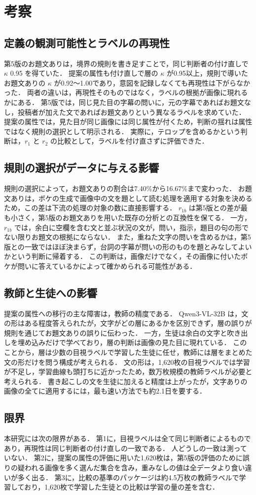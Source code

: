 \section{考察}
\label{sec_discussion}
\subsection{定義の観測可能性とラベルの再現性}
第5版のお題文ありは，境界の規則を書き足すことで，同じ判断者の付け直しで $ \kappa $ 0.95 を得ていた．
提案の属性も付け直しで層の $ \kappa $ が0.95以上，規則で導いたお題文ありの $ \kappa $ が0.92〜1.00であり，意図を記録しなくても再現性は下がらなかった．
両者の違いは，再現性そのものではなく，ラベルの根拠が画像に現れるかにある．
第5版では，同じ見た目の字幕の問いに，元の字幕であればお題文なし，投稿者が加えた文であればお題文ありという異なるラベルを求めていた．
提案の属性では，見た目が同じ画像には同じ属性が付くため，判断の揺れは属性ではなく規則の選択として明示される．
実際に，テロップを含めるかという判断は，$ r_1 $ と $ r_2 $ の比較として，ラベルを付け直さずに評価できた．

\subsection{規則の選択がデータに与える影響}
規則の選択によって，お題文ありの割合は7.40\%から16.67\%まで変わった．
お題文ありは，ボケの生成で画像中の文を題として読む処理を適用する対象を決めるため，この差は下流の処理の対象の数に直接影響する．
$ r_{1b} $ は第5版との差が最も小さく，第5版のお題文ありを用いた既存の分析との互換性を保てる．
一方，$ r_{1b} $ では，余白に空欄を含む文と並ぶ状況の文が，問い，指示，題目の句の形でない限りお題文の根拠にならない．
また，重ねた文字の問いを含めるかは，第5版との一致ではほぼ決まらず，台詞の字幕が問いの形のものを題とみなしてよいかという判断に帰着する．
この判断は，画像だけでなく，その画像に付いたボケが問いに答えているかによって確かめられる可能性がある．

\subsection{教師と生徒への影響}
提案の属性への移行の主な障害は，教師の精度である．
Qwen3-VL-32B は，文の形はある程度答えられたが，文字がどの層にあるかを区別できず，層の誤りが規則を通じてお題文ありの誤りに伝わった．
一方，生徒は余白の文字と吹き出しを埋め込みだけで学べており，層の判断は画像の見た目に現れている．
このことから，層は少数の目視ラベルで学習した生徒に任せ，教師には層をまとめた文の形だけを問う構成が考えられる．
文の形は，1,620枚の目視ラベルでは学習が不足し，学習曲線も頭打ちに近かったため，数万枚規模の教師ラベルが必要と考えられる．
書き起こしの文を生徒に加えると精度は上がったが，文字ありの画像の全てに適用するには，最も速い方法でも約2.1日を要する．

\subsection{限界}
本研究には次の限界がある．
第1に，目視ラベルは全て同じ判断者によるものであり，再現性は同じ判断者の付け直しの一致である．
人どうしの一致は測っていない．
第2に，提案の属性の評価に用いた1,620枚は，第5版の評価のために誤りの疑われる画像を多く選んだ集合を含み，重みなしの値は全データより食い違いが多く出る．
第3に，比較の基準のパッケージは約4.5万枚の教師ラベルで学習しており，1,620枚で学習した生徒との比較は学習の量の差を含む．
